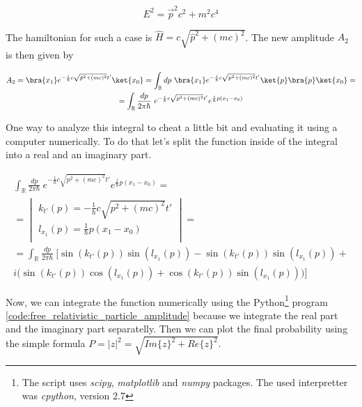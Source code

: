 \begin{equation}
    \label{eq:relativistic_energy}
    E^{2} = \vec{p}^{2} c^{2} + m^{2} c^{4}
\end{equation}

The hamiltonian for such a case is $\hat{H} = c\sqrt{\hat{p}^{2} + (mc)^{2}}$. The new amplitude $A_{2}$ is then given by

\begin{equation*}
    \begin{gathered}
        A_{2} = \bra{x_{1}} e^{- \frac{i}{\hbar} c\sqrt{\hat{p}^{2} + (mc)^{2}} t'}\ket{x_{0}} = \int_{\mathbb{R}} dp \ \bra{x_{1}} e^{- \frac{i}{\hbar} c \sqrt{p^{2} + (mc)^{2}} t'} \ket{p} \bra{p} \ket{x_{0}} = \\
        = \int_{\mathbb{R}} \frac{dp}{2 \pi \hbar} \ e^{- \frac{i}{\hbar} c \sqrt{p^{2} + (mc)^{2}} t'} e^{\frac{i}{\hbar}p (x_{1} - x_{0})}
    \end{gathered}
\end{equation*}

One way to analyze this integral to cheat a little bit and evaluating it using a computer numerically. To do that let's split 
the function inside of the integral into a real and an imaginary part.

\begin{equation*}
    \begin{gathered}
        \int_{\mathbb{R}} \frac{dp}{2 \pi \hbar} \ e^{- \frac{i}{\hbar} c \sqrt{p^{2} + (mc)^{2}} t'} e^{\frac{i}{\hbar}p (x_{1} - x_{0})} =  \\
        = \begin{vmatrix}
            k_{t'}(p) = - \frac{1}{\hbar} c \sqrt{p^{2} + (mc)^{2}} t' \\
            l_{x_{1}}(p) = \frac{1}{\hbar}p (x_{1} - x_{0}) \\
        \end{vmatrix} = \\
        = \int_{\mathbb{R}} \frac{dp}{2 \pi \hbar} \ \bigg[ \sin(k_{t'}(p)) \sin(l_{x_{1}}(p)) - \sin(k_{t'}(p)) \sin(l_{x_{1}}(p)) + \\ i\big(\sin(k_{t'}(p)) \cos(l_{x_{1}}(p)) + \cos(k_{t'}(p)) \sin(l_{x_{1}}(p))\big) \bigg]
    \end{gathered}
\end{equation*}

Now, we can integrate the function numerically using the Python\footnote{The script uses \textit{scipy}, \textit{matplotlib} and \textit{numpy} packages. 
The used interpretter was \textit{cpython}, version 2.7} program \ref{code:free_relativistic_particle_amplitude}  because we integrate the 
real part and the imaginary part separatelly. Then we can plot the final probability using the simple formula $P = |z|^{2} = \sqrt{Im\{z\}^{2} + Re\{z\}^{2}}$.

